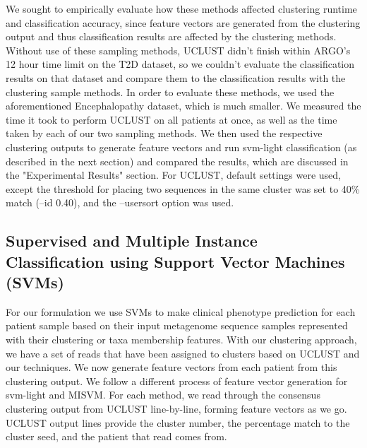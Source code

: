We sought to empirically evaluate how these methods affected clustering runtime and classification accuracy, since feature vectors are generated from the clustering output and thus classification results are affected by the clustering methods. Without use of these sampling methods, UCLUST didn't finish within ARGO's 12 hour time limit on the T2D dataset, so we couldn't evaluate the classification results on that dataset and compare them to the classification results with the clustering sample methods. In order to evaluate these methods, we used the aforementioned Encephalopathy dataset, which is much smaller. We measured the time it took to perform UCLUST on all patients at once, as well as the time taken by each of our two sampling methods. We then used the respective clustering outputs to generate feature vectors and run svm-light classification (as described in the next section) and compared the results, which are discussed in the "Experimental Results" section. For UCLUST, default settings were used, except the threshold for placing two sequences in the same cluster was set to 40\% match (--id 0.40), and the --usersort option was used.


\subsection{Supervised and Multiple Instance Classification using Support Vector Machines (SVMs)}
\label{svm}

For our formulation we use SVMs to make clinical phenotype prediction for each patient sample based on their  input metagenome sequence samples represented with their clustering or taxa membership features. With our clustering approach,  we have a set of reads that have been assigned to clusters based on UCLUST and our techniques. We now generate feature vectors from each patient from this clustering output. We follow a different process of feature vector generation for svm-light and MISVM. For each method, we read through the consensus clustering output from UCLUST line-by-line, forming feature vectors as we go. UCLUST output lines provide the cluster number, the percentage match to the cluster seed, and the patient that read comes from.

